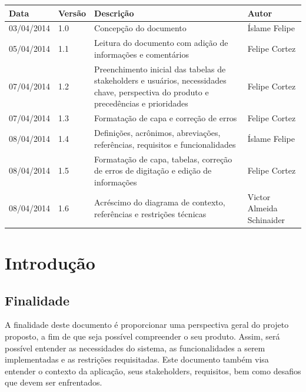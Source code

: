 \documentclass[12pt, a4paper]{article}
\begin{document}
    \begin{tabu}{X[-1] | X[-1, r] | X | X[-1]}
        \hline
        \textbf{Data} &
        \textbf{Versão} &
        \textbf{Descrição} &
        \textbf{Autor}
        \\ \hline

        03/04/2014 &
        1.0 &
        Concepção do documento &
        Íslame Felipe
        \\ \hline

        05/04/2014 &
        1.1 &
        Leitura do documento com adição de informações e comentários &
        Felipe Cortez
        \\ \hline

        07/04/2014 &
        1.2 &
        Preenchimento inicial das tabelas de stakeholders e usuários,
        necessidades chave, perspectiva do produto e precedências e prioridades
        &
        Felipe Cortez
        \\ \hline

        07/04/2014 &
        1.3 &
        Formatação de capa e correção de erros &
        Felipe Cortez
        \\ \hline

        08/04/2014 &
        1.4 &
        Definições, acrônimos, abreviações, referências, requisitos e funcionalidades &
        Íslame Felipe
        \\ \hline

        08/04/2014 &
        1.5 &
        Formatação de capa, tabelas, correção de erros de digitação e edição de
        informações &
        Felipe Cortez
        \\ \hline
        
        08/04/2014 &
        1.6 &
        Acréscimo do diagrama de contexto, referências e restrições técnicas &
        Victor Almeida Schinaider
        \\ \hline
    \end{tabu}

    \newpage

    \tableofcontents

    \newpage

    \section{Introdução}
        \subsection{Finalidade}
        A finalidade deste documento é proporcionar uma perspectiva geral do
        projeto proposto, a fim de que seja possível compreender o seu produto.
        Assim, será possível entender as necessidades do sistema, as
        funcionalidades a serem implementadas e as restrições requisitadas.
        Este documento também visa entender o contexto da aplicação, seus
        stakeholders, requisitos, bem como desafios que devem ser enfrentados.
\end{document}
